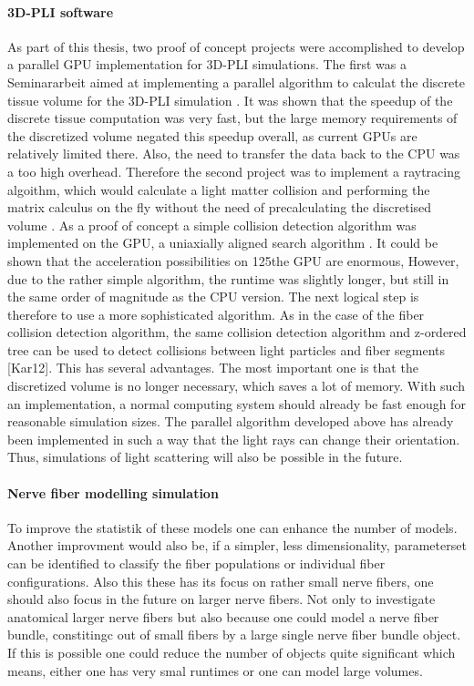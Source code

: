 \paragraph{\ac{3D-PLI} software}
% 
% 
As part of this thesis, two proof of concept projects were accomplished to develop a parallel GPU implementation for 3D-PLI simulations.
The first was a Seminararbeit aimed at implementing a parallel algorithm to calculat the discrete tissue volume for the 3D-PLI simulation \cite{Kobusch:Seminar}.
It was shown that the speedup of the discrete tissue computation was very fast, but the large memory requirements of the discretized volume negated this speedup overall, as current GPUs are relatively limited there.
Also, the need to transfer the data back to the CPU was a too high overhead.
Therefore the second project was to implement a raytracing algoithm, which would calculate a light matter collision and performing the matrix calculus on the fly without the need of precalculating the discretised volume \cite{Kobusch:887783}.
As a proof of concept a simple collision detection algorithm was implemented on the GPU, a uniaxially aligned search algorithm \cite{Karras2012}.
It could be shown that the acceleration possibilities on 125the GPU are enormous, However, due to the rather simple algorithm, the runtime was slightly longer, but still in the same order of magnitude as the CPU version.
The next logical step is therefore to use a more sophisticated algorithm.
As in the case of the fiber collision detection algorithm, the same collision detection algorithm and z-ordered tree can be used to detect collisions between light particles and fiber segments [Kar12].
This has several advantages.
The most important one is that the discretized volume is no longer necessary, which saves a lot of memory.
With such an implementation, a normal computing system should already be fast enough for reasonable simulation sizes.
The parallel algorithm developed above has already been implemented in such a way that the light rays can change their orientation.
Thus, simulations of light scattering will also be possible in the future.
% 
% 
% 
\paragraph{Nerve fiber modelling simulation}
% 
To improve the statistik of these models one can enhance the number of models.
Another improvment would also be, if a simpler, \ie{} less dimensionality, parameterset can be identified to classify the fiber populations or individual fiber configurations.
Also this these has its focus on rather small nerve fibers, one should also focus in the future on larger nerve fibers.
Not only to investigate anatomical larger nerve fibers but also because one could model a nerve fiber bundle, constitingc out of small fibers by a large single nerve fiber bundle object.
If this is possible one could reduce the number of objects quite significant which means, either one has very smal runtimes or one can model large volumes.
% 
% 
% 
